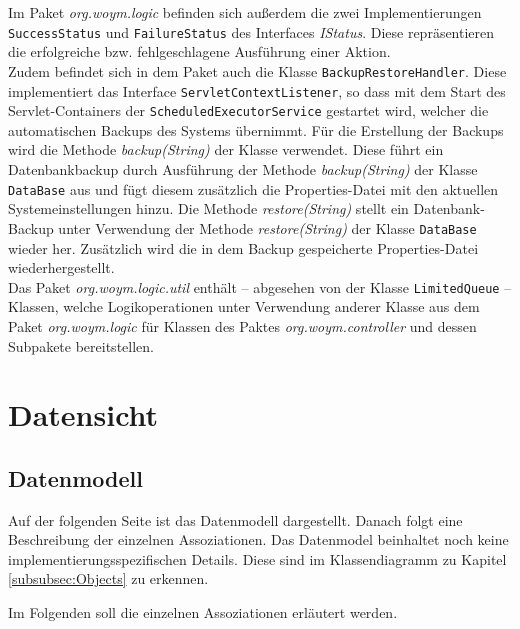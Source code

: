\documentclass[fontsize=12pt,paper=a4,twoside]{scrartcl}
\begin{document}
Im Paket \textit{org.woym.logic} befinden sich außerdem die zwei Implementierungen \texttt{SuccessStatus} und \texttt{FailureStatus} des Interfaces \textit{IStatus}. Diese repräsentieren die erfolgreiche bzw. fehlgeschlagene Ausführung einer Aktion.\\
Zudem befindet sich in dem Paket auch die Klasse \texttt{BackupRestoreHandler}. Diese implementiert das Interface \texttt{ServletContextListener}, so dass mit dem Start des Servlet-Containers der \texttt{ScheduledExecutorService} gestartet wird, welcher die automatischen Backups des Systems übernimmt. Für die Erstellung der Backups wird die Methode \textit{backup(String)} der Klasse verwendet. Diese führt ein Datenbankbackup durch Ausführung der Methode \textit{backup(String)} der Klasse \texttt{DataBase} aus und fügt diesem zusätzlich die Properties-Datei mit den aktuellen Systemeinstellungen hinzu. Die Methode \textit{restore(String)} stellt ein Datenbank-Backup unter Verwendung der Methode \textit{restore(String)} der Klasse \texttt{DataBase} wieder her. Zusätzlich wird die in dem Backup gespeicherte Properties-Datei wiederhergestellt. \\
Das Paket \textit{org.woym.logic.util} enthält -- abgesehen von der Klasse \texttt{LimitedQueue} -- Klassen, welche Logikoperationen unter Verwendung anderer Klasse aus dem Paket \textit{org.woym.logic} für Klassen des Paktes \textit{org.woym.controller} und dessen Subpakete bereitstellen. %







\section{Datensicht}
\label{sec:datensicht}
  
\subsection{Datenmodell}
Auf der folgenden Seite ist das Datenmodell dargestellt. Danach folgt eine Beschreibung der einzelnen Assoziationen. Das Datenmodel beinhaltet noch keine implementierungsspezifischen Details. Diese sind im Klassendiagramm zu Kapitel \ref{subsubsec:Objects} zu erkennen.

Im Folgenden soll die einzelnen Assoziationen erläutert werden.\\
\end{document}
